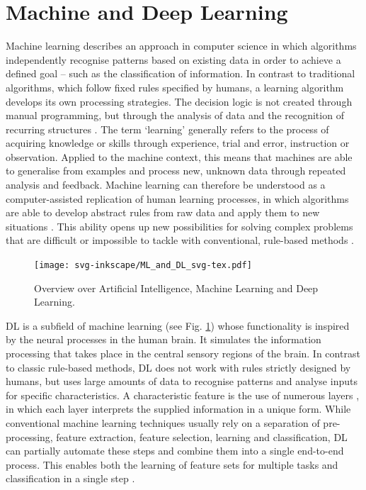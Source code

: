 \section{Machine and Deep Learning}
Machine learning describes an approach in computer science in which algorithms independently recognise patterns based on existing data in order to achieve a defined goal – such as the classification of information. In contrast to traditional algorithms, which follow fixed rules specified by humans, a learning algorithm develops its own processing strategies. The decision logic is not created through manual programming, but through the analysis of data and the recognition of recurring structures \cite{Shetty2022}. The term ‘learning’ generally refers to the process of acquiring knowledge or skills through experience, trial and error, instruction or observation. Applied to the machine context, this means that machines are able to generalise from examples and process new, unknown data through repeated analysis and feedback. Machine learning can therefore be understood as a computer-assisted replication of human learning processes, in which algorithms are able to develop abstract rules from raw data and apply them to new situations \cite {Fischer1999, Braga-Neto2020}. This ability opens up new possibilities for solving complex problems that are difficult or impossible to tackle with conventional, rule-based methods \cite{Goodfellow-et-al-2016}.



\begin{figure}[h]
    \centering
    \texttt{[image: svg-inkscape/ML\_and\_DL\_svg-tex.pdf]}
    \caption{Overview over Artificial Intelligence, Machine Learning and Deep Learning. \cite{Alzubaidi2021}}
    \label{fig:ML_andD_L}
\end{figure}

\acrfull{DL} is a subfield of machine learning (see Fig. \ref{fig:ML_andD_L}) whose functionality is inspired by the neural processes in the human brain. It simulates the information processing that takes place in the central sensory regions of the brain. In contrast to classic rule-based methods, \acrshort{DL} does not work with rules strictly designed by humans, but uses large amounts of data to recognise patterns and analyse inputs for specific characteristics. A characteristic feature is the use of numerous layers , in which each layer interprets the supplied information in a unique form. While conventional machine learning techniques usually rely on a separation of pre-processing, feature extraction, feature selection, learning and classification, \acrshort{DL} can partially automate these steps and combine them into a single end-to-end process. This enables both the learning of feature sets for multiple tasks and classification in a single step \cite{Alzubaidi2021}.
 
